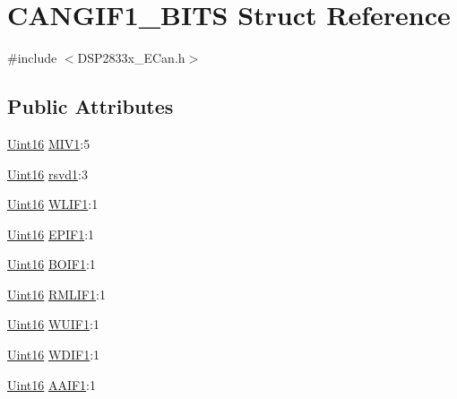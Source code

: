 \hypertarget{struct_c_a_n_g_i_f1___b_i_t_s}{}\section{C\+A\+N\+G\+I\+F1\+\_\+\+B\+I\+T\+S Struct Reference}
\label{struct_c_a_n_g_i_f1___b_i_t_s}


{\ttfamily \#include $<$D\+S\+P2833x\+\_\+\+E\+Can.\+h$>$}

\subsection*{Public Attributes}
\begin{DoxyCompactItemize}
\item 
\hyperlink{_d_s_p2833x___device_8h_a59a9f6be4562c327cbfb4f7e8e18f08b}{Uint16} \hyperlink{struct_c_a_n_g_i_f1___b_i_t_s_a3c0111e158ea881b26abdde2d9d054fe}{M\+I\+V1}\+:5
\item 
\hyperlink{_d_s_p2833x___device_8h_a59a9f6be4562c327cbfb4f7e8e18f08b}{Uint16} \hyperlink{struct_c_a_n_g_i_f1___b_i_t_s_a947647734a41e9b35f8622b0b01b6c86}{rsvd1}\+:3
\item 
\hyperlink{_d_s_p2833x___device_8h_a59a9f6be4562c327cbfb4f7e8e18f08b}{Uint16} \hyperlink{struct_c_a_n_g_i_f1___b_i_t_s_ac5d05096e150eed5550e96710bfc833f}{W\+L\+I\+F1}\+:1
\item 
\hyperlink{_d_s_p2833x___device_8h_a59a9f6be4562c327cbfb4f7e8e18f08b}{Uint16} \hyperlink{struct_c_a_n_g_i_f1___b_i_t_s_a5ca8d2a47e3970117775ff1c7e472e23}{E\+P\+I\+F1}\+:1
\item 
\hyperlink{_d_s_p2833x___device_8h_a59a9f6be4562c327cbfb4f7e8e18f08b}{Uint16} \hyperlink{struct_c_a_n_g_i_f1___b_i_t_s_a8812ae2d41d756b912b7b5a569e7da4f}{B\+O\+I\+F1}\+:1
\item 
\hyperlink{_d_s_p2833x___device_8h_a59a9f6be4562c327cbfb4f7e8e18f08b}{Uint16} \hyperlink{struct_c_a_n_g_i_f1___b_i_t_s_ae8ec48bd6d44e4841ec7f04355b044f0}{R\+M\+L\+I\+F1}\+:1
\item 
\hyperlink{_d_s_p2833x___device_8h_a59a9f6be4562c327cbfb4f7e8e18f08b}{Uint16} \hyperlink{struct_c_a_n_g_i_f1___b_i_t_s_ad6b44edb5114dd5b608621b6a02eadd0}{W\+U\+I\+F1}\+:1
\item 
\hyperlink{_d_s_p2833x___device_8h_a59a9f6be4562c327cbfb4f7e8e18f08b}{Uint16} \hyperlink{struct_c_a_n_g_i_f1___b_i_t_s_a89fd7fa36296dc960fe7ee4754b2f317}{W\+D\+I\+F1}\+:1
\item 
\hyperlink{_d_s_p2833x___device_8h_a59a9f6be4562c327cbfb4f7e8e18f08b}{Uint16} \hyperlink{struct_c_a_n_g_i_f1___b_i_t_s_a04afe46905cdc921a9e7cd6d1f070047}{A\+A\+I\+F1}\+:1

\end{DoxyCompactItemize}
